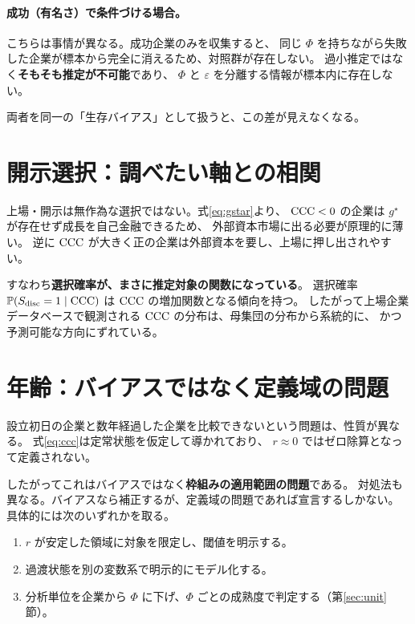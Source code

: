 \paragraph{成功（有名さ）で条件づける場合。}
こちらは事情が異なる。成功企業のみを収集すると、
同じ $\Phi$ を持ちながら失敗した企業が標本から完全に消えるため、対照群が存在しない。
過小推定ではなく\textbf{そもそも推定が不可能}であり、
$\Phi$ と $\varepsilon$ を分離する情報が標本内に存在しない。

両者を同一の「生存バイアス」として扱うと、この差が見えなくなる。

\section{開示選択：調べたい軸との相関}
\label{sec:disclosure}

上場・開示は無作為な選択ではない。式\eqref{eq:gstar}より、
$\mathrm{CCC}<0$ の企業は $g^\star$ が存在せず成長を自己金融できるため、
外部資本市場に出る必要が原理的に薄い。
逆に $\mathrm{CCC}$ が大きく正の企業は外部資本を要し、上場に押し出されやすい。

すなわち\textbf{選択確率が、まさに推定対象の関数になっている}。
選択確率 $\mathbb{P}(S_{\mathrm{disc}}=1 \mid \mathrm{CCC})$ は $\mathrm{CCC}$ の増加関数となる傾向を持つ。
したがって上場企業データベースで観測される $\mathrm{CCC}$ の分布は、母集団の分布から系統的に、
かつ予測可能な方向にずれている。

\section{年齢：バイアスではなく定義域の問題}
\label{sec:age}

設立初日の企業と数年経過した企業を比較できないという問題は、性質が異なる。
式\eqref{eq:ccc}は定常状態を仮定して導かれており、
$r\approx 0$ ではゼロ除算となって定義されない。

したがってこれはバイアスではなく\textbf{枠組みの適用範囲の問題}である。
対処法も異なる。バイアスなら補正するが、定義域の問題であれば宣言するしかない。
具体的には次のいずれかを取る。

\begin{enumerate}[label=(\arabic*)]
\item $r$ が安定した領域に対象を限定し、閾値を明示する。
\item 過渡状態を別の変数系で明示的にモデル化する。
\item 分析単位を企業から $\Phi$ に下げ、$\Phi$ ごとの成熟度で判定する（第\ref{sec:unit}節）。
\end{enumerate}

